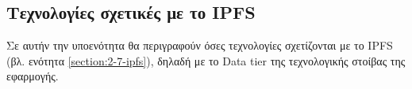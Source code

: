 \subsection{Τεχνολογίες σχετικές με το IPFS}

Σε αυτήν την υποενότητα θα περιγραφούν όσες τεχνολογίες σχετίζονται με το IPFS (βλ. ενότητα \ref{section:2-7-ipfs}), δηλαδή με το Data tier της τεχνολογικής στοίβας της εφαρμογής.




